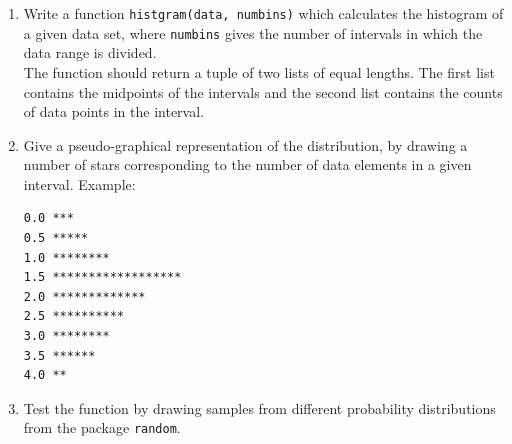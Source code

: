 \documentclass[smallheadings,12pt]{scrartcl}
\begin{document}
\begin{enumerate}
\item Write a function {\tt histgram(data, numbins)} which calculates the
  histogram of a given data set, where {\tt numbins} gives the number of intervals in which the data range is divided.\\
  The function should return a tuple of two lists of equal lengths. The first list contains the midpoints of
  the intervals and the second list contains the
  counts of data points in the interval. 
\item Give a pseudo-graphical representation of the distribution, by
  drawing a number of stars corresponding to the number of
  data elements in a given interval. Example:
\begin{verbatim}
0.0 ***
0.5 *****
1.0 ********
1.5 ******************
2.0 *************
2.5 **********
3.0 ********
3.5 ******
4.0 **
\end{verbatim}
\item Test the function by drawing samples from different probability
  distributions from the package {\tt random}. 
\end{enumerate}
\end{document}
